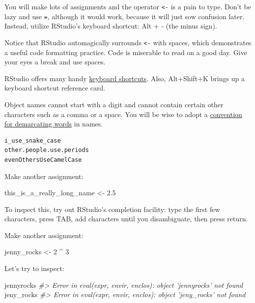 \documentclass[
]{book}
\newenvironment{Shaded}{\begin{snugshade}}{\end{snugshade}}
\newcommand{\CommentTok}[1]{\textcolor[rgb]{0.56,0.35,0.01}{\textit{#1}}}
\newcommand{\DecValTok}[1]{\textcolor[rgb]{0.00,0.00,0.81}{#1}}
\newcommand{\FloatTok}[1]{\textcolor[rgb]{0.00,0.00,0.81}{#1}}
\newcommand{\NormalTok}[1]{#1}
\newcommand{\OperatorTok}[1]{\textcolor[rgb]{0.81,0.36,0.00}{\textbf{#1}}}
\newcommand{\StringTok}[1]{\textcolor[rgb]{0.31,0.60,0.02}{#1}}
\begin{document}
You will make lots of assignments and the operator \texttt{\textless{}-} is a pain to type. Don't be lazy and use \texttt{=}, although it would work, because it will just sow confusion later. Instead, utilize RStudio's keyboard shortcut: Alt + - (the minus sign).

Notice that RStudio automagically surrounds \texttt{\textless{}-} with spaces, which demonstrates a useful code formatting practice. Code is miserable to read on a good day. Give your eyes a break and use spaces.

RStudio offers many handy \href{https://support.rstudio.com/hc/en-us/articles/200711853-Keyboard-Shortcuts}{keyboard shortcuts}. Also, Alt+Shift+K brings up a keyboard shortcut reference card.

Object names cannot start with a digit and cannot contain certain other characters such as a comma or a space. You will be wise to adopt a \href{https://en.wikipedia.org/wiki/Snake_case}{convention for demarcating words} in names.

\begin{verbatim}
i_use_snake_case
other.people.use.periods
evenOthersUseCamelCase
\end{verbatim}

Make another assignment:

\begin{Shaded}
\begin{Highlighting}[]
\NormalTok{this_is_a_really_long_name <-}\StringTok{ }\FloatTok{2.5}
\end{Highlighting}
\end{Shaded}

To inspect this, try out RStudio's completion facility: type the first few characters, press TAB, add characters until you disambiguate, then press return.

Make another assignment:

\begin{Shaded}
\begin{Highlighting}[]
\NormalTok{jenny_rocks <-}\StringTok{ }\DecValTok{2} \OperatorTok{^}\StringTok{ }\DecValTok{3}
\end{Highlighting}
\end{Shaded}

Let's try to inspect:

\begin{Shaded}
\begin{Highlighting}[]
\NormalTok{jennyrocks}
\CommentTok{#> Error in eval(expr, envir, enclos): object 'jennyrocks' not found}
\NormalTok{jeny_rocks}
\CommentTok{#> Error in eval(expr, envir, enclos): object 'jeny_rocks' not found}
\end{Highlighting}
\end{Shaded}
\end{document}
